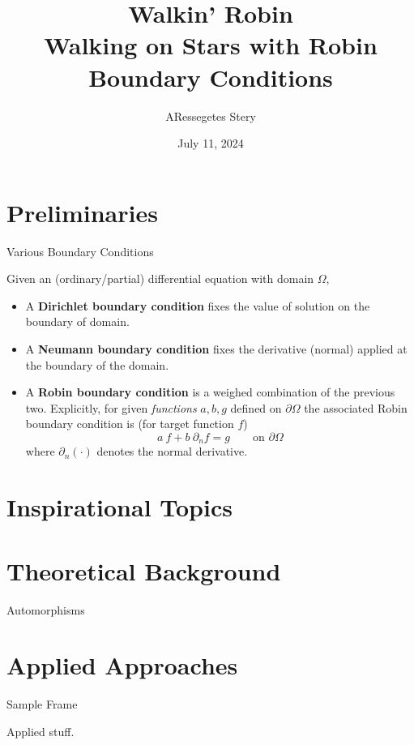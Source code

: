 \documentclass{beamer}
\title{Walkin' Robin \\[1pt] {\Large Walking on Stars with Robin Boundary Conditions}}
\author{ARessegetes Stery}
\date{July 11, 2024}
\begin{document}
\maketitle


\section{Preliminaries}

\begin{frame}{Various Boundary Conditions}

	\begin{definition}
		Given an (ordinary/partial) differential equation with domain $\Omega$,
		\begin{itemize}
			\item A \textbf{Dirichlet boundary condition} fixes the value of solution on the boundary of domain. 
			\item A \textbf{Neumann boundary condition} fixes the derivative (normal) applied at the boundary of the domain.
			\item A \textbf{Robin boundary condition} is a weighed combination of the previous two. Explicitly, for given \emph{functions} $a, b, g$ defined on $\partial \Omega$ the associated Robin boundary condition is (for target function $f$)
			\[
				a\ f + b\ \partial_n f = g \qquad \text{on $\partial \Omega$}
			\]
			where $\partial_n(\cdot)$ denotes the normal derivative.
		\end{itemize}
	\end{definition}
	\horzline

\end{frame}


\section{Inspirational Topics}

\begin{frame}
    
\end{frame}


\section{Theoretical Background}

\begin{frame}{Automorphisms}

\end{frame}


\section{Applied Approaches}

\begin{frame}{Sample Frame}

	Applied stuff.

\end{frame}


\thankframe
\end{document}
